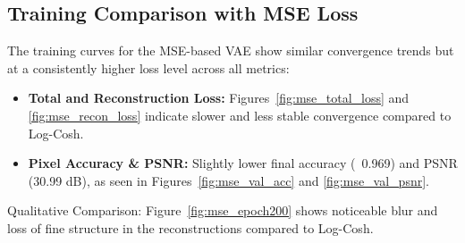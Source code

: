 \subsection{Training Comparison with MSE Loss} \label{subsubsec:vae_mse_loss}

The training curves for the MSE-based VAE show similar convergence trends but at a consistently higher loss level across all metrics:

\begin{itemize}
    \item \textbf{Total and Reconstruction Loss:} Figures~\ref{fig:mse_total_loss} and \ref{fig:mse_recon_loss} indicate slower and less stable convergence compared to Log-Cosh.
    \item \textbf{Pixel Accuracy \& PSNR:} Slightly lower final accuracy (~0.969) and PSNR (30.99 dB), as seen in Figures~\ref{fig:mse_val_acc} and \ref{fig:mse_val_psnr}.
\end{itemize}

Qualitative Comparison: Figure~\ref{fig:mse_epoch200} shows noticeable blur and loss of fine structure in the reconstructions compared to Log-Cosh.

